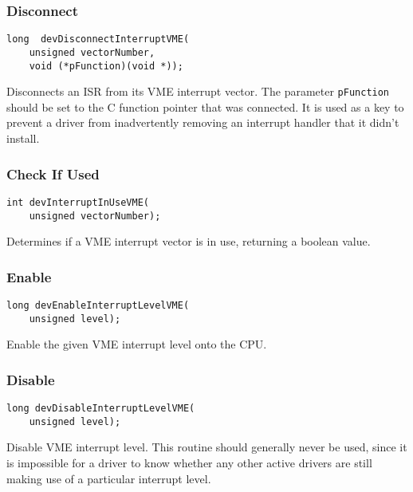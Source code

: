 \subsubsection{Disconnect}

\begin{verbatim}
long  devDisconnectInterruptVME(
    unsigned vectorNumber,
    void (*pFunction)(void *));
\end{verbatim}

Disconnects an ISR from its VME interrupt vector. The parameter \verb|pFunction| should be set to the C function pointer 
that was connected. It is used as a key to prevent a driver from inadvertently removing an interrupt handler that it didn't 
install.

\subsubsection{Check If Used}

\begin{verbatim}
int devInterruptInUseVME(
    unsigned vectorNumber);
\end{verbatim}

Determines if a VME interrupt vector is in use, returning a boolean value.

\subsubsection{Enable}

\begin{verbatim}
long devEnableInterruptLevelVME(
    unsigned level);
\end{verbatim}

Enable the given VME interrupt level onto the CPU.

\subsubsection{Disable}

\begin{verbatim}
long devDisableInterruptLevelVME(
    unsigned level);
\end{verbatim}

Disable VME interrupt level. This routine should generally never be used, since it is impossible for a driver to know 
whether any other active drivers are still making use of a particular interrupt level.

